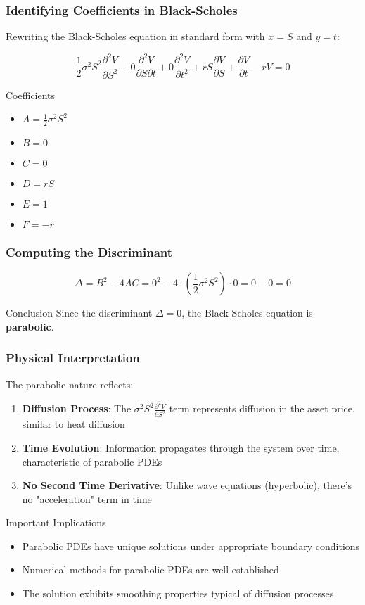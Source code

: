 \documentclass{beamer}
\begin{document}
\begin{frame}
\frametitle{Identifying Coefficients in Black-Scholes}
Rewriting the Black-Scholes equation in standard form with $x = S$ and $y = t$:

$$\frac{1}{2}\sigma^2 S^2 \frac{\partial^2 V}{\partial S^2} + 0 \frac{\partial^2 V}{\partial S \partial t} + 0 \frac{\partial^2 V}{\partial t^2} + rS \frac{\partial V}{\partial S} + \frac{\partial V}{\partial t} - rV = 0$$

\begin{block}{Coefficients}
\begin{itemize}
\item $A = \frac{1}{2}\sigma^2 S^2$
\item $B = 0$
\item $C = 0$
\item $D = rS$
\item $E = 1$
\item $F = -r$
\end{itemize}
\end{block}
\end{frame}

\begin{frame}
\frametitle{Computing the Discriminant}
$$\Delta = B^2 - 4AC = 0^2 - 4 \cdot \left(\frac{1}{2}\sigma^2 S^2\right) \cdot 0 = 0 - 0 = 0$$

\begin{block}{Conclusion}
Since the discriminant $\Delta = 0$, the Black-Scholes equation is \textbf{parabolic}.
\end{block}
\end{frame}

\begin{frame}
\frametitle{Physical Interpretation}
The parabolic nature reflects:

\begin{enumerate}
\item \textbf{Diffusion Process}: The $\sigma^2 S^2 \frac{\partial^2 V}{\partial S^2}$ term represents diffusion in the asset price, similar to heat diffusion

\item \textbf{Time Evolution}: Information propagates through the system over time, characteristic of parabolic PDEs

\item \textbf{No Second Time Derivative}: Unlike wave equations (hyperbolic), there's no "acceleration" term in time
\end{enumerate}

\begin{block}{Important Implications}
\begin{itemize}
\item Parabolic PDEs have unique solutions under appropriate boundary conditions
\item Numerical methods for parabolic PDEs are well-established
\item The solution exhibits smoothing properties typical of diffusion processes
\end{itemize}
\end{block}
\end{frame}
\end{document}
